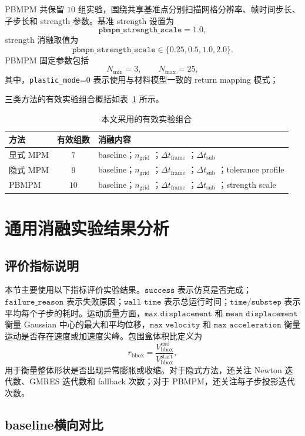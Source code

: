 \documentclass[a4paper]{article}
\begin{document}
PBMPM 共保留 $10$ 组实验，围绕共享基准点分别扫描网格分辨率、帧时间步长、子步长和 strength 参数。基准 strength 设置为
\[
    \texttt{pbmpm\_strength\_scale}=1.0,
\]
strength 消融取值为
\[
    \texttt{pbmpm\_strength\_scale}
    \in
    \{0.25,0.5,1.0,2.0\}.
\]
PBMPM 固定参数包括
\[
    N_{\min}=3,\qquad
    N_{\max}=25,
\]
其中，\texttt{plastic\_mode}=0 表示使用与材料模型一致的 return mapping 模式；

三类方法的有效实验组合概括如表~\ref{tab:experiment-design} 所示。

\begin{table}[H]
\centering
\caption{本文采用的有效实验组合}
\label{tab:experiment-design}
\begin{tabular}{lcl}
\toprule
方法 & 有效组数 & 消融内容 \\
\midrule
显式 MPM & $7$ &
baseline；$n_{\mathrm{grid}}$ ；$\Delta t_{\mathrm{frame}}$ ；$\Delta t_{\mathrm{sub}}$  \\
隐式 MPM & $9$ &
baseline；$n_{\mathrm{grid}}$ ；$\Delta t_{\mathrm{frame}}$ ；$\Delta t_{\mathrm{sub}}$ ；tolerance profile  \\
PBMPM & $10$ &
baseline；$n_{\mathrm{grid}}$ ；$\Delta t_{\mathrm{frame}}$ ；$\Delta t_{\mathrm{sub}}$ ；strength scale  \\
\bottomrule
\end{tabular}
\end{table}
\section{通用消融实验结果分析}

\subsection{评价指标说明}
本节主要使用以下指标评价实验结果。$\texttt{success}$ 表示仿真是否完成；$\texttt{failure\_reason}$ 表示失败原因；$\texttt{wall time}$ 表示总运行时间；$\texttt{time/substep}$ 表示平均每个子步的耗时。运动质量方面，$\texttt{max displacement}$ 和 $\texttt{mean displacement}$ 衡量 Gaussian 中心的最大和平均位移，$\texttt{max velocity}$ 和 $\texttt{max acceleration}$ 衡量运动是否存在速度或加速度尖峰。包围盒体积比定义为
\[
    r_{\mathrm{bbox}}
    =
    \frac{
        V_{\mathrm{bbox}}^{\mathrm{end}}
    }{
        V_{\mathrm{bbox}}^{\mathrm{start}}
    },
\]
用于衡量整体形状是否出现异常膨胀或收缩。对于隐式方法，还关注 Newton 迭代数、GMRES 迭代数和 fallback 次数；对于 PBMPM，还关注每子步投影迭代次数。

\subsection{baseline横向对比}
\end{document}
